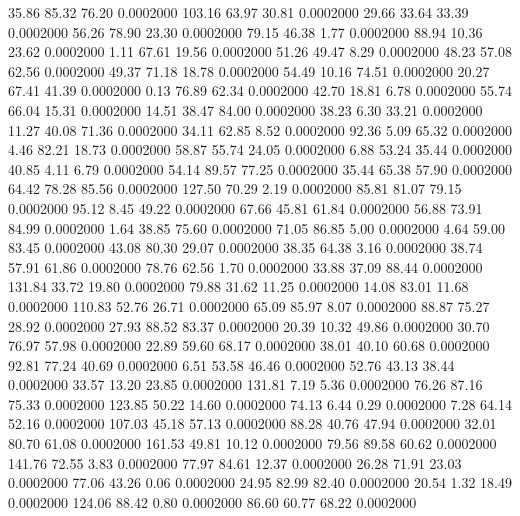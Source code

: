   35.86   85.32   76.20   0.0002000
 103.16   63.97   30.81   0.0002000
  29.66   33.64   33.39   0.0002000
  56.26   78.90   23.30   0.0002000
  79.15   46.38    1.77   0.0002000
  88.94   10.36   23.62   0.0002000
   1.11   67.61   19.56   0.0002000
  51.26   49.47    8.29   0.0002000
  48.23   57.08   62.56   0.0002000
  49.37   71.18   18.78   0.0002000
  54.49   10.16   74.51   0.0002000
  20.27   67.41   41.39   0.0002000
   0.13   76.89   62.34   0.0002000
  42.70   18.81    6.78   0.0002000
  55.74   66.04   15.31   0.0002000
  14.51   38.47   84.00   0.0002000
  38.23    6.30   33.21   0.0002000
  11.27   40.08   71.36   0.0002000
  34.11   62.85    8.52   0.0002000
  92.36    5.09   65.32   0.0002000
   4.46   82.21   18.73   0.0002000
  58.87   55.74   24.05   0.0002000
   6.88   53.24   35.44   0.0002000
  40.85    4.11    6.79   0.0002000
  54.14   89.57   77.25   0.0002000
  35.44   65.38   57.90   0.0002000
  64.42   78.28   85.56   0.0002000
 127.50   70.29    2.19   0.0002000
  85.81   81.07   79.15   0.0002000
  95.12    8.45   49.22   0.0002000
  67.66   45.81   61.84   0.0002000
  56.88   73.91   84.99   0.0002000
   1.64   38.85   75.60   0.0002000
  71.05   86.85    5.00   0.0002000
   4.64   59.00   83.45   0.0002000
  43.08   80.30   29.07   0.0002000
  38.35   64.38    3.16   0.0002000
  38.74   57.91   61.86   0.0002000
  78.76   62.56    1.70   0.0002000
  33.88   37.09   88.44   0.0002000
 131.84   33.72   19.80   0.0002000
  79.88   31.62   11.25   0.0002000
  14.08   83.01   11.68   0.0002000
 110.83   52.76   26.71   0.0002000
  65.09   85.97    8.07   0.0002000
  88.87   75.27   28.92   0.0002000
  27.93   88.52   83.37   0.0002000
  20.39   10.32   49.86   0.0002000
  30.70   76.97   57.98   0.0002000
  22.89   59.60   68.17   0.0002000
  38.01   40.10   60.68   0.0002000
  92.81   77.24   40.69   0.0002000
   6.51   53.58   46.46   0.0002000
  52.76   43.13   38.44   0.0002000
  33.57   13.20   23.85   0.0002000
 131.81    7.19    5.36   0.0002000
  76.26   87.16   75.33   0.0002000
 123.85   50.22   14.60   0.0002000
  74.13    6.44    0.29   0.0002000
   7.28   64.14   52.16   0.0002000
 107.03   45.18   57.13   0.0002000
  88.28   40.76   47.94   0.0002000
  32.01   80.70   61.08   0.0002000
 161.53   49.81   10.12   0.0002000
  79.56   89.58   60.62   0.0002000
 141.76   72.55    3.83   0.0002000
  77.97   84.61   12.37   0.0002000
  26.28   71.91   23.03   0.0002000
  77.06   43.26    0.06   0.0002000
  24.95   82.99   82.40   0.0002000
  20.54    1.32   18.49   0.0002000
 124.06   88.42    0.80   0.0002000
  86.60   60.77   68.22   0.0002000
